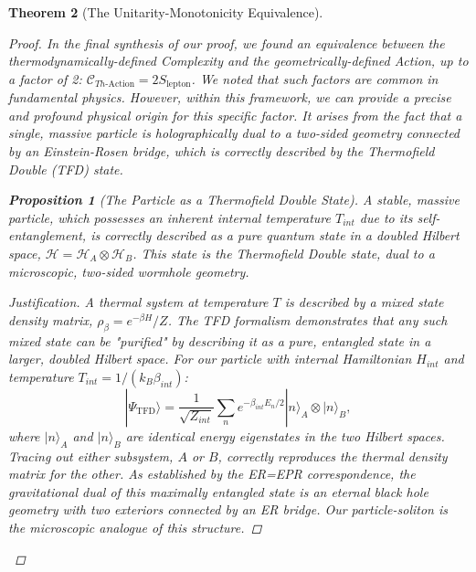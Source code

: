 \documentclass[11pt, letterpaper]{report}
\theoremstyle{plain} %
\newtheorem{theorem}{Theorem}[chapter]
\newtheorem{proposition}[theorem]{Proposition}
\theoremstyle{definition} %
\theoremstyle{remark} %
\begin{document}
\begin{theorem}[The Unitarity-Monotonicity Equivalence]
\begin{proof}
In the final synthesis of our proof, we found an equivalence between the thermodynamically-defined Complexity and the geometrically-defined Action, up to a factor of 2: $\mathcal{C}_{Th\text{-Action}} = 2 S_{\text{lepton}}$. We noted that such factors are common in fundamental physics. However, within this framework, we can provide a precise and profound physical origin for this specific factor. It arises from the fact that a single, massive particle is holographically dual to a two-sided geometry connected by an Einstein-Rosen bridge, which is correctly described by the Thermofield Double (TFD) state.

\begin{proposition}[The Particle as a Thermofield Double State]
A stable, massive particle, which possesses an inherent internal temperature $T_{int}$ due to its self-entanglement, is correctly described as a pure quantum state in a doubled Hilbert space, $\mathcal{H} = \mathcal{H}_A \otimes \mathcal{H}_B$. This state is the Thermofield Double state, dual to a microscopic, two-sided wormhole geometry.
\end{proposition}
\begin{proof}[Justification]
A thermal system at temperature $T$ is described by a mixed state density matrix, $\rho_\beta = e^{-\beta H}/Z$. The TFD formalism demonstrates that any such mixed state can be "purified" by describing it as a pure, entangled state in a larger, doubled Hilbert space. For our particle with internal Hamiltonian $H_{int}$ and temperature $T_{int} = 1/(k_B\beta_{int})$:
\begin{equation}
    |\Psi_{\text{TFD}}\rangle = \frac{1}{\sqrt{Z_{int}}} \sum_n e^{-\beta_{int} E_n/2} |n\rangle_A \otimes |n\rangle_B,
\end{equation}
where $|n\rangle_A$ and $|n\rangle_B$ are identical energy eigenstates in the two Hilbert spaces. Tracing out either subsystem, $A$ or $B$, correctly reproduces the thermal density matrix for the other. As established by the ER=EPR correspondence, the gravitational dual of this maximally entangled state is an eternal black hole geometry with two exteriors connected by an ER bridge. Our particle-soliton is the microscopic analogue of this structure.
\end{proof}


\end{proof}
\end{theorem}
\end{document}
